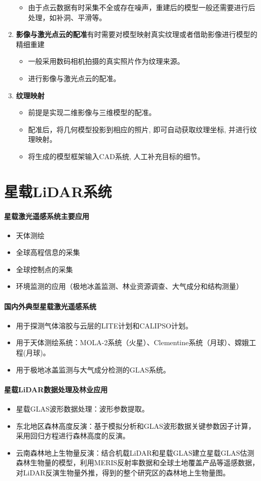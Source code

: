 \begin{enumerate}
\begin{itemize}
			\item 由于点云数据有时采集不全或存在噪声，重建后的模型一般还需要进行后处理，如补洞、平滑等。
		\end{itemize}
	\item \textbf{影像与激光点云的配准}有时需要对模型映射真实纹理或者借助影像进行模型的精细重建
		\begin{itemize}
			\item 一般采用数码相机拍摄的真实照片作为纹理来源。
			\item 进行影像与激光点云的配准。
		\end{itemize}
	\item \textbf{纹理映射}
		\begin{itemize}
			\item 前提是实现二维影像与三维模型的配准。
			\item 配准后，将几何模型投影到相应的照片, 即可自动获取纹理坐标, 并进行纹理映射。
			\item 将生成的模型框架输入CAD系统, 人工补充目标的细节。
		\end{itemize}
\end{enumerate}

\section{星载LiDAR系统}

\paragraph{星载激光遥感系统主要应用}
\begin{itemize}
	\item 天体测绘
	\item 全球高程信息的采集
	\item 全球控制点的采集
	\item 环境监测的应用（极地冰盖监测、林业资源调查、大气成分和结构测量）
\end{itemize}

\paragraph{国内外典型星载激光遥感系统}
\begin{itemize}
	\item 用于探测气体溶胶与云层的LITE计划和CALIPSO计划。
	\item 用于天体测绘系统：MOLA-2系统（火星）、Clementine系统（月球）、嫦娥工程(月球)。
	\item 用于极地冰盖监测与大气成分检测的GLAS系统。
\end{itemize}

\paragraph{星载LiDAR数据处理及林业应用}
\begin{itemize}
	\item 星载GLAS波形数据处理：波形参数提取。
	\item 东北地区森林高度反演：基于模拟分析和GLAS波形数据关键参数因子计算，采用回归方程进行森林高度的反演。
	\item 云南森林地上生物量反演：结合机载LiDAR和星载GLAS建立星载GLAS估测森林生物量的模型，利用MERIS反射率数据和全球土地覆盖产品等遥感数据，对LiDAR反演生物量外推，得到的整个研究区的森林地上生物量图。
\end{itemize}